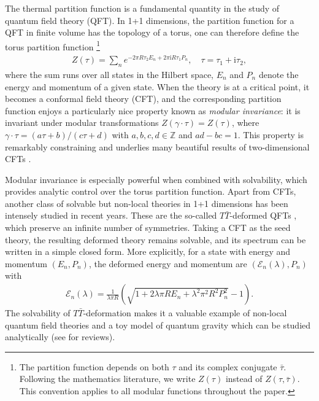 \documentclass[aps,twocolumn,prl,showpacs,amsmath,amssymb,10pt]{revtex4-2}
\begin{document}
 The thermal partition function is a fundamental quantity in the study of quantum field theory (QFT). In 1+1 dimensions, the partition function for a QFT in finite volume has the topology of a torus, one can therefore define the torus partition function \footnote{The partition function depends on both $\tau$ and its complex conjugate $\bar{\tau}$. Following the mathematics literature, we write $Z(\tau)$ instead of $Z(\tau,\bar{\tau})$. This convention applies to all modular functions throughout the paper.}
\begin{align}
Z(\tau)=\sum_n e^{-2\pi R\tau_2 E_n+2\pi \mathrm{i} R\tau_1 P_n},\quad \tau=\tau_1+\mathrm{i}\tau_2,
\end{align}
where the sum runs over all states in the Hilbert space, $E_n$ and $P_n$ denote the energy and momentum of a given state. When the theory is at a critical point, it becomes a conformal field theory (CFT), and the corresponding partition function enjoys a particularly nice property known as \emph{modular invariance}: it is invariant under modular transformations $Z(\gamma\cdot\tau)=Z(\tau)$, where $\gamma\cdot\tau=(a\tau+b)/(c\tau+d)$ with $a,b,c,d\in\mathbb{Z}$ and $ad-bc=1$. This property is remarkably constraining and underlies many beautiful results of two-dimensional CFTs \cite{Ginsparg:1988ui,DiFrancesco:1997nk}.\par

Modular invariance is especially powerful when combined with solvability, which provides analytic control over the torus partition function. Apart from CFTs, another class of solvable but non-local theories in 1+1 dimensions has been intensely studied in recent years. These are the so-called $T\bar{T}$-deformed QFTs \cite{Smirnov:2016lqw,Cavaglia:2016oda}, which preserve an infinite number of symmetries. Taking a CFT as the seed theory, the resulting deformed theory remains solvable, and its spectrum can be written in a simple closed form. More explicitly, for a state with energy and momentum $(E_n,P_n)$, the deformed energy and momentum are $(\mathcal{E}_n(\lambda),P_n)$ with \cite{Smirnov:2016lqw,Cavaglia:2016oda}
\begin{align}
\mathcal{E}_n(\lambda)=\frac{1}{\lambda\pi R}\left(\sqrt{1+2\lambda\pi R E_n+\lambda^2\pi^2 R^2 P_n^2}-1\right).
\end{align}
The solvability of $T\bar{T}$-deformation makes it a valuable example of non-local quantum field theories and a toy model of quantum gravity which can be studied analytically (see \cite{Jiang:2019epa,He:2025ppz} for reviews).
\end{document}
